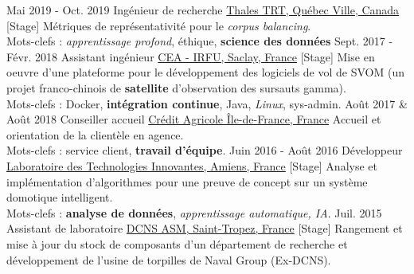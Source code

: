 \documentclass[a4paper]{twentysecondcv} %
\begin{document}
\begin{twenty} %
    \twentyitem
        {Mai 2019 -}
        {Oct. 2019}
        {Ingénieur de recherche}
        {\href{https://www.parctechno.com/fr/registre/?id=97}{Thales TRT, Québec Ville, Canada}}
        {}
        {{[Stage]} Métriques de représentativité pour le \textit{corpus balancing}.\\Mots-clefs : \textit{apprentissage profond}, éthique, \textbf{science des données}}
    \twentyitem
    	{Sept. 2017 -}
                {Févr. 2018}
        {Assistant ingénieur}
        {\href{http://irfu.cea.fr/}{CEA - IRFU, Saclay, France}}
        {}
        {{[Stage]} Mise en oeuvre d'une plateforme pour le développement des logiciels de vol de SVOM (un projet franco-chinois de \textbf{satellite} d'observation des sursauts gamma).\\Mots-clefs : Docker, \textbf{intégration continue}, Java, \textit{Linux}, sys-admin.}
    \twentyitem
        {Août 2017 \&}
                {Août 2018}
        {Conseiller accueil}
        {\href{https://ca-paris.com/}{Crédit Agricole Île-de-France, France}}
        {}
        {Accueil et orientation de la clientèle en agence.\\Mots-clefs : service client, \textbf{travail d'équipe}.}
	\twentyitem
    	{Juin 2016 -}
		{Août 2016}
        {Développeur}
        {\href{http://lti-picardie.fr/}{Laboratoire des Technologies Innovantes, Amiens, France}}
        {}
        {{[Stage]} Analyse et implémentation d'algorithmes pour une preuve de concept sur un système domotique intelligent.\\Mots-clefs : \textbf{analyse de données}, \textit{apprentissage automatique, IA}.}
     \twentyitem
   		{Juil. 2015}
		{}
        {Assistant de laboratoire}
        {\href{https://www.naval-group.com/fr/}{DCNS ASM, Saint-Tropez, France}}
        {}
        {{[Stage]} Rangement et mise à jour du stock de composants d'un département de recherche et développement de l'usine de torpilles de Naval Group (Ex-DCNS).}
\end{twenty}

\end{document}
